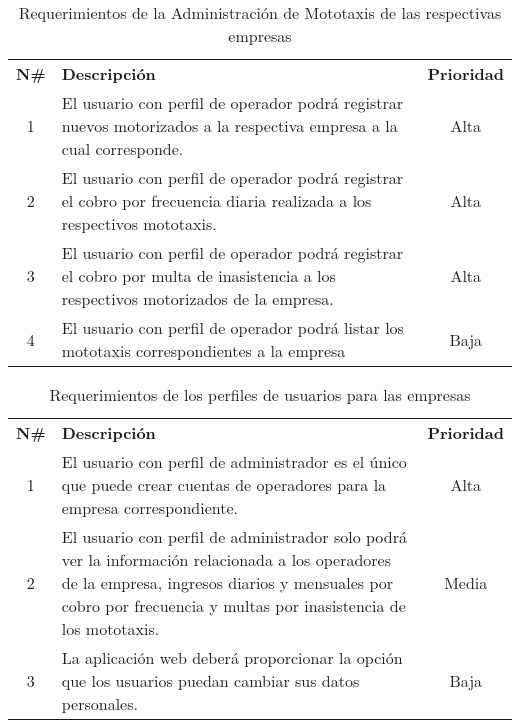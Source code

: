 \begin{table}[H]
	\centering
    \begin{tabular}{ |c|p{10cm}|c| }
	  \hline
	  \rowcolor{indigo-dark} \multicolumn{3}{|c|}{ \textcolor{white}{\textbf{Administración de Mototaxis}}} \\
	  \hline
	  \rowcolor{indigo-light} \textbf{N\#} & \centering \textbf{Descripción} & \textbf{Prioridad} \\
	  \hline
	  1 & El usuario con perfil de operador podrá registrar nuevos motorizados a la respectiva empresa a la cual corresponde. & Alta \\
	  \hline
	  2 & El usuario con perfil de operador podrá registrar el cobro por frecuencia diaria realizada a los respectivos mototaxis. & Alta \\
	  \hline
	  3 & El usuario con perfil de operador podrá registrar el cobro por multa de inasistencia a los respectivos motorizados de la empresa. & Alta \\
	  \hline
	  4 & El usuario con perfil de operador podrá listar los mototaxis correspondientes a la empresa & Baja \\
	  \hline
	\end{tabular}
	\caption{Requerimientos de la Administración de Mototaxis de las respectivas empresas}
\end{table}

\begin{table}[H]
	\centering
    \begin{tabular}{ |c|p{10cm}|c| }
	  \hline
	  \rowcolor{indigo-dark} \multicolumn{3}{|c|}{ \textcolor{white}{\textbf{Administración de Usuarios}}} \\
	  \hline
	  \rowcolor{indigo-light} \textbf{N\#} & \centering \textbf{Descripción} & \textbf{Prioridad} \\
	  \hline
	  1 & El usuario con perfil de administrador es el único que puede crear cuentas de operadores para la empresa correspondiente. & Alta\\
	  \hline
	  2 & El usuario con perfil de administrador solo podrá ver la información relacionada a los operadores de la empresa, ingresos diarios y mensuales por cobro por frecuencia y multas por inasistencia de los mototaxis. & Media \\
	  \hline
	  3 & La aplicación web deberá proporcionar la opción que los usuarios puedan  cambiar sus datos personales. & Baja \\
	  \hline
	\end{tabular}
	\caption{Requerimientos de los perfiles de usuarios para las empresas}
\end{table}

